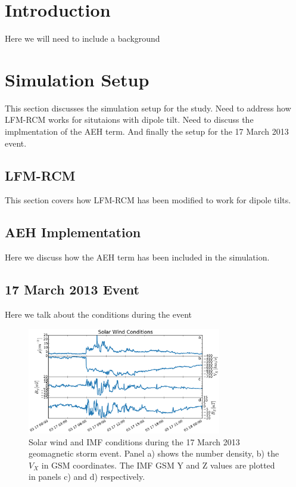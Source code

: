 \documentclass[draft,jgrga]{agutex}
\begin{document}
\begin{article}

%
%

\section{Introduction}

Here we will need to include a background 

\section{Simulation Setup}
\label{sec-model-sims}
This section discusses the simulation setup for the study.  Need to address how LFM-RCM works for situtaions with dipole tilt.  Need to discuss the implmentation of the AEH term.  And finally the setup for the 17 March 2013 event.

\subsection{LFM-RCM}

This section covers how LFM-RCM has been modified to work for dipole tilts.

\subsection{AEH Implementation}

Here we discuss how the AEH term has been included in the simulation.

\subsection{17 March 2013 Event}

Here we talk about the conditions  during the event

\begin{figure}
\noindent\includegraphics[width=20pc]{JGRPaper-SWFig.pdf}
\caption{\label{sw-fig} 
Solar wind and IMF conditions during the 17 March 2013 geomagnetic storm event.  Panel a) shows the number density, b) the $V_X$ in GSM coordinates.  The IMF GSM Y and Z values are plotted in panels c) and d) respectively.} 
\end{figure}


\end{article}
\end{document}
